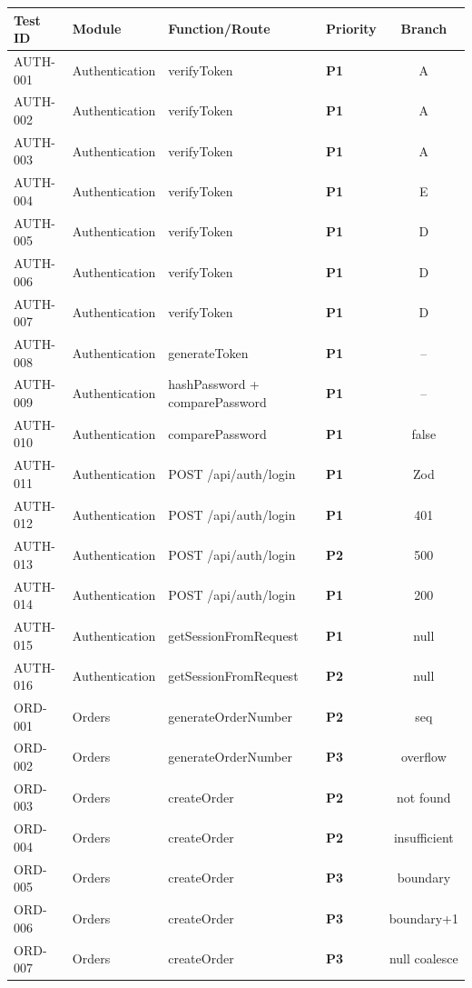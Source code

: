 \documentclass[12pt,a4paper]{report}
\newcommand{\pone}{\textbf{\color{p1red}P1}}
\newcommand{\ptwo}{\textbf{\color{p2orange}P2}}
\newcommand{\pthree}{\textbf{\color{p3blue}P3}}
\begin{document}
\begin{center}
\begin{longtable}{llllc}
  \toprule
  \textbf{Test ID} & \textbf{Module} & \textbf{Function/Route} & \textbf{Priority} & \textbf{Branch} \\
  \midrule
  \endhead
  AUTH-001 & Authentication & verifyToken & \pone & A \\
  AUTH-002 & Authentication & verifyToken & \pone & A \\
  AUTH-003 & Authentication & verifyToken & \pone & A \\
  AUTH-004 & Authentication & verifyToken & \pone & E \\
  AUTH-005 & Authentication & verifyToken & \pone & D \\
  AUTH-006 & Authentication & verifyToken & \pone & D \\
  AUTH-007 & Authentication & verifyToken & \pone & D \\
  AUTH-008 & Authentication & generateToken & \pone & -- \\
  AUTH-009 & Authentication & hashPassword + comparePassword & \pone & -- \\
  AUTH-010 & Authentication & comparePassword & \pone & false \\
  AUTH-011 & Authentication & POST /api/auth/login & \pone & Zod \\
  AUTH-012 & Authentication & POST /api/auth/login & \pone & 401 \\
  AUTH-013 & Authentication & POST /api/auth/login & \ptwo & 500 \\
  AUTH-014 & Authentication & POST /api/auth/login & \pone & 200 \\
  AUTH-015 & Authentication & getSessionFromRequest & \pone & null \\
  AUTH-016 & Authentication & getSessionFromRequest & \ptwo & null \\
  ORD-001  & Orders & generateOrderNumber & \ptwo & seq \\
  ORD-002  & Orders & generateOrderNumber & \pthree & overflow \\
  ORD-003  & Orders & createOrder & \ptwo & not found \\
  ORD-004  & Orders & createOrder & \ptwo & insufficient \\
  ORD-005  & Orders & createOrder & \pthree & boundary \\
  ORD-006  & Orders & createOrder & \pthree & boundary+1 \\
  ORD-007  & Orders & createOrder & \pthree & null coalesce \\

\end{longtable}
\end{center}
\end{document}
